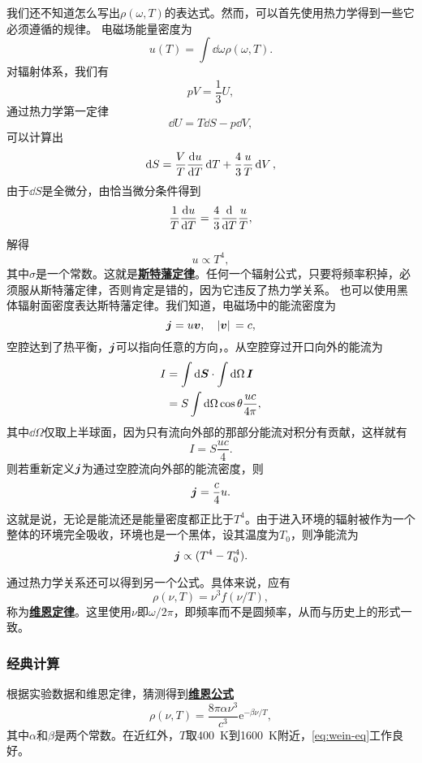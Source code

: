 \documentclass[UTF8, a4paper]{ctexart}
\newcommand*{\ee}{\mathrm{e}}
\newcommand{\concept}[1]{\underline{\textbf{#1}}}
\begin{document}
我们还不知道怎么写出$\rho(\omega, T)$的表达式。然而，可以首先使用热力学得到一些它必须遵循的规律。
电磁场能量密度为
\[
    u(T) = \int \dd{\omega} \rho(\omega, T).
\]
对辐射体系，我们有
\begin{equation}
    pV = \frac{1}{3} U,
\end{equation}
通过热力学第一定律
\[
    \dd{U} = T \dd{S} - p \dd{V},
\]
可以计算出
\[
    \dd{S} = \frac{V}{T} \dv{u}{T} \dd{T} + \frac{4}{3} \frac{u}{T} \dd{V},
\]
由于$\dd{S}$是全微分，由恰当微分条件得到
\[
    \frac{1}{T} \dv{u}{T} = \frac{4}{3} \dv{T} \frac{u}{T},
\]
解得
\begin{equation}
    u \propto T^4,
\end{equation}
其中$\sigma$是一个常数。这就是\concept{斯特藩定律}。任何一个辐射公式，只要将频率积掉，必须服从斯特藩定律，否则肯定是错的，因为它违反了热力学关系。
也可以使用黑体辐射面密度表达斯特藩定律。我们知道，电磁场中的能流密度为
\[
    \vb*{j} = u \vb*{v}, \quad \abs*{\vb*{v}} = c, 
\]
空腔达到了热平衡，$\vb*{j}$可以指向任意的方向，。从空腔穿过开口向外的能流为%
\[
    \begin{aligned}
        I &= \int \dd{\vb*{S}} \cdot \int \dd{\Omega} \vb*{I} \\
        &= S \int \dd{\Omega} \cos \theta \frac{u c}{4 \pi},
    \end{aligned}
\]
其中$\dd{\Omega}$仅取上半球面，因为只有流向外部的那部分能流对积分有贡献，这样就有
\[
    I = S \frac{u c}{4}.
\]
则若重新定义$\vb*{j}$为通过空腔流向外部的能流密度，则
\begin{equation}
    \vb*{j} = \frac{c}{4} u.
\end{equation}
这就是说，无论是能流还是能量密度都正比于$T^4$。由于进入环境的辐射被作为一个整体的环境完全吸收，环境也是一个黑体，设其温度为$T_0$，则净能流为
\begin{equation}
    \vb*{j} \propto (T^4-T_0^4).
\end{equation}

通过热力学关系还可以得到另一个公式。具体来说，应有
\begin{equation}
    \rho(\nu, T) = \nu^3 f(\nu / T),
\end{equation}
称为\concept{维恩定律}。这里使用$\nu$即$\omega/2\pi$，即频率而不是圆频率，从而与历史上的形式一致。

\subsubsection{经典计算}

根据实验数据和维恩定律，猜测得到\concept{维恩公式}
\begin{equation}
    \rho(\nu, T) = \frac{8\pi \alpha \nu^3}{c^3} \ee^{- \beta \nu / T},
    \label{eq:wein-eq}
\end{equation}
其中$\alpha$和$\beta$是两个常数。在近红外，$T$取\SI{400}{K}到\SI{1600}{K}附近，\eqref{eq:wein-eq}工作良好。
\end{document}
